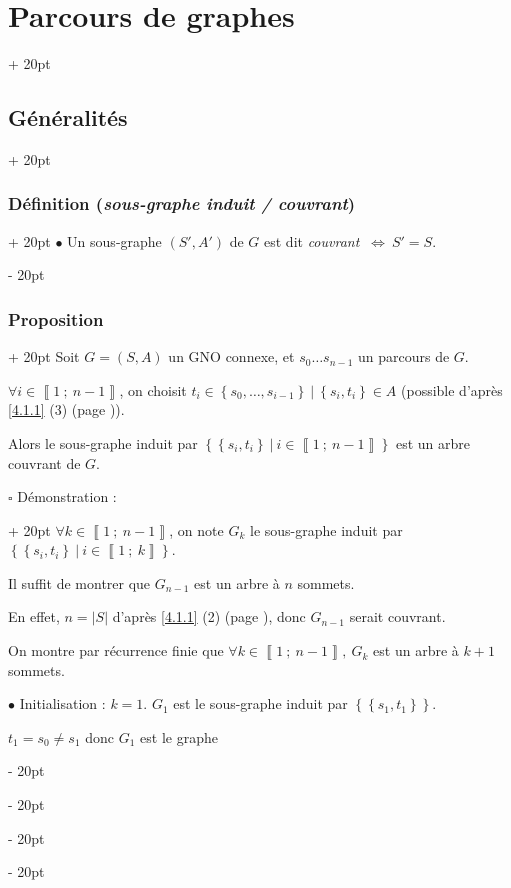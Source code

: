 \documentclass[a4paper, 12pt, twoside]{article}
\newcommand{\nset}[2]{\left\llbracket #1\ ;\ #2 \right\rrbracket}
\newcommand{\set}[1]{\left\{ #1 \right\}}
\newcommand{\abs}[1]{\left\lvert #1 \right\rvert}
\newcommand{\ssi}{\ \Leftrightarrow \ }
\newcommand{\ind}[1][20pt]{\advance\leftskip + #1}
\newcommand{\deind}[1][20pt]{\advance\leftskip - #1}
\newenvironment{indt}[2][20pt]{#2 \par \ind[#1]}{\par \deind} %
\begin{document}
\begin{indt}{\section{Parcours de graphes}}
\begin{indt}{\subsection{Généralités}}
\begin{indt}{\subsubsection{Définition (\textit{sous-graphe induit / couvrant})}}
                $\bullet$ Un sous-graphe $(S', A')$ de $G$ est dit \textit{couvrant} $\ssi S' = S$.
            \end{indt}

            \vspace{12pt}
            
            \begin{indt}{\subsubsection{Proposition}}
                Soit $G = (S, A)$ un GNO connexe, et $s_0 \ldots s_{n - 1}$ un parcours de $G$.

                $\forall i \in \nset 1 {n - 1}$, on choisit $t_i \in \set{s_0, \ldots, s_{i - 1}}\ |\ \set{s_i, t_i} \in A$ (possible d'après \ref{4.1.1} (3) (page \pageref{4.1.1})).

                \vspace{6pt}
                
                Alors le sous-graphe induit par $\set{\set{s_i, t_i}\ |\ i \in \nset 1 {n - 1}}$ est un arbre couvrant de $G$.

                \vspace{6pt}
                
                \begin{indt}{$\square$ Démonstration :}
                    $\forall k \in \nset 1 {n - 1}$, on note $G_k$ le sous-graphe induit par $\set{\set{s_i, t_i}\ |\ i \in \nset 1 {k}}$.

                    Il suffit de montrer que $G_{n - 1}$ est un arbre à $n$ sommets.

                    En effet, $n = \abs S$ d'après \ref{4.1.1} (2) (page \pageref{4.1.1}), donc $G_{n - 1}$ serait couvrant.

                    On montre par récurrence finie que $\forall k \in \nset 1 {n - 1},\ G_k$ est un arbre à $k + 1$ sommets.

                    \vspace{6pt}
                    
                    $\bullet$ Initialisation : $k = 1$. $G_1$ est le sous-graphe induit par $\set{\set{s_1, t_1}}$.

                    $t_1 = s_0 \neq s_1$ donc $G_1$ est le graphe 
                    \begin{center}
\end{center}
\end{indt}
\end{indt}
\end{indt}
\end{indt}
\end{document}
